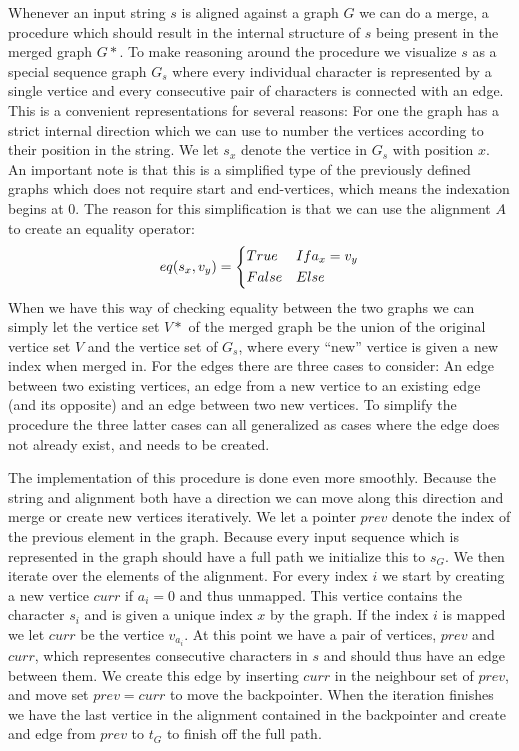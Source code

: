 \documentclass[thesis.tex]{subfiles}
\begin{document}
\par\noindent
Whenever an input string $s$ is aligned against a graph $G$ we can do a merge, a procedure which should result in the internal structure of $s$ being present in the merged graph $G*$. To make reasoning around the procedure we visualize $s$ as a special sequence graph $G_s$ where every individual character is represented by a single vertice and every consecutive pair of characters is connected with an edge. This is a convenient representations for several reasons: For one the graph has a strict internal direction which we can use to number the vertices according to their position in the string. We let $s_x$ denote the vertice in $G_s$ with position $x$. An important note is that this is a simplified type of the previously defined graphs which does not require start and end-vertices, which means the indexation begins at 0. The reason for this simplification is that we can use the alignment $A$ to create an equality operator:
\begin{equation}
  eq(s_x, v_y) =
  \begin{dcases}
    True & If a_x=v_y\\
    False & Else
  \end{dcases}
\end{equation}
When we have this way of checking equality between the two graphs we can simply let the vertice set $V*$ of the merged graph be the union of the original vertice set $V$ and the vertice set of $G_s$, where every ``new'' vertice is given a new index when merged in. For the edges there are three cases to consider: An edge between two existing vertices, an edge from a new vertice to an existing edge (and its opposite) and an edge between two new vertices. To simplify the procedure the three latter cases can all generalized as cases where the edge does not already exist, and needs to be created.\\
\par\noindent
The implementation of this procedure is done even more smoothly. Because the string and alignment both have a direction we can move along this direction and merge or create new vertices iteratively. We let a pointer $prev$ denote the index of the previous element in the graph. Because every input sequence which is represented in the graph should have a full path we initialize this to $s_G$. We then iterate over the elements of the alignment. For every index $i$ we start by creating a new vertice $curr$ if $a_i = 0$ and thus unmapped. This vertice contains the character $s_i$ and is given a unique index $x$ by the graph. If the index $i$ is mapped we let $curr$ be the vertice $v_{a_i}$. At this point we have a pair of vertices, $prev$ and $curr$, which representes consecutive characters in $s$ and should thus have an edge between them. We create this edge by inserting $curr$ in the neighbour set of $prev$, and move set $prev=curr$ to move the backpointer. When the iteration finishes we have the last vertice in the alignment contained in the backpointer and create and edge from $prev$ to $t_G$ to finish off the full path.\\
\end{document}
